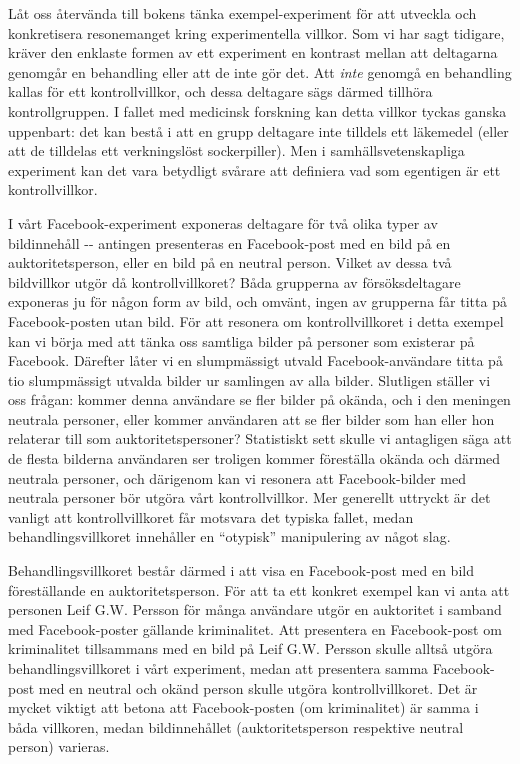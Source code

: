 \documentclass[
]{book}
\begin{document}
Låt oss återvända till bokens tänka exempel-experiment för att utveckla och konkretisera resonemanget kring experimentella villkor. Som vi har sagt tidigare, kräver den enklaste formen av ett experiment en kontrast mellan att deltagarna genomgår en behandling eller att de inte gör det. Att \emph{inte} genomgå en behandling kallas för ett kontrollvillkor, och dessa deltagare sägs därmed tillhöra kontrollgruppen. I fallet med medicinsk forskning kan detta villkor tyckas ganska uppenbart: det kan bestå i att en grupp deltagare inte tilldels ett läkemedel (eller att de tilldelas ett verkningslöst sockerpiller). Men i samhällsvetenskapliga experiment kan det vara betydligt svårare att definiera vad som egentigen är ett kontrollvillkor.

I vårt Facebook-experiment exponeras deltagare för två olika typer av bildinnehåll -\/- antingen presenteras en Facebook-post med en bild på en auktoritetsperson, eller en bild på en neutral person. Vilket av dessa två bildvillkor utgör då kontrollvillkoret? Båda grupperna av försöksdeltagare exponeras ju för någon form av bild, och omvänt, ingen av grupperna får titta på Facebook-posten utan bild. För att resonera om kontrollvillkoret i detta exempel kan vi börja med att tänka oss samtliga bilder på personer som existerar på Facebook. Därefter låter vi en slumpmässigt utvald Facebook-användare titta på tio slumpmässigt utvalda bilder ur samlingen av alla bilder. Slutligen ställer vi oss frågan: kommer denna användare se fler bilder på okända, och i den meningen neutrala personer, eller kommer användaren att se fler bilder som han eller hon relaterar till som auktoritetspersoner? Statistiskt sett skulle vi antagligen säga att de flesta bilderna användaren ser troligen kommer föreställa okända och därmed neutrala personer, och därigenom kan vi resonera att Facebook-bilder med neutrala personer bör utgöra vårt kontrollvillkor. Mer generellt uttryckt är det vanligt att kontrollvillkoret får motsvara det typiska fallet, medan behandlingsvillkoret innehåller en ``otypisk'' manipulering av något slag.

Behandlingsvillkoret består därmed i att visa en Facebook-post med en bild föreställande en auktoritetsperson. För att ta ett konkret exempel kan vi anta att personen Leif G.W. Persson för många användare utgör en auktoritet i samband med Facebook-poster gällande kriminalitet. Att presentera en Facebook-post om kriminalitet tillsammans med en bild på Leif G.W. Persson skulle alltså utgöra behandlingsvillkoret i vårt experiment, medan att presentera samma Facebook-post med en neutral och okänd person skulle utgöra kontrollvillkoret. Det är mycket viktigt att betona att Facebook-posten (om kriminalitet) är samma i båda villkoren, medan bildinnehållet (auktoritetsperson respektive neutral person) varieras.
\end{document}
